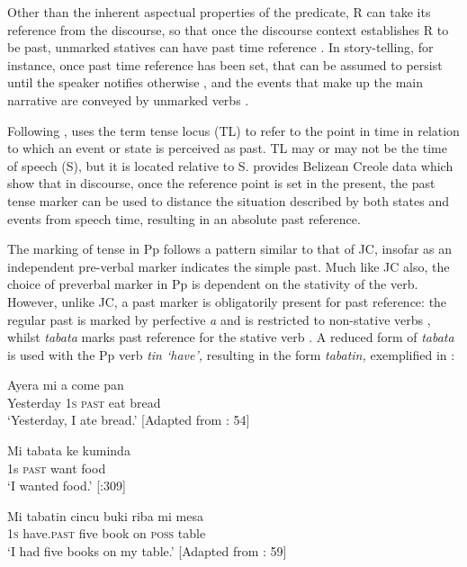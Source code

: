 \documentclass[output=paper,colorlinks,citecolor=brown]{langscibook}
\begin{document}
Other than the inherent aspectual properties of the predicate, R can take its reference from the discourse, so that once the discourse context establishes R to be past, unmarked statives can have past time reference \citep[396]{Winford2000tenseaspect}. In story-telling, for instance, once past time reference has been set, that can be assumed to persist until the speaker notifies otherwise \citep[159]{Winford2001comparison}, and the events that make up the main narrative are conveyed by unmarked verbs \citep[404]{Winford2000tenseaspect}.

Following \citet{ChungTimberlake1985}, \citet{Gooden2008} uses the term tense locus (TL) to refer to the point in time in relation to which an event or state is perceived as past. TL may or may not be the time of speech (S), but it is located relative to S. \citet[322ff.]{Gooden2008} provides Belizean Creole data which show that in discourse, once the reference point is set in the present, the past tense marker can be used to distance the situation described by both states and events from speech time, resulting in an absolute past reference.

The marking of tense in Pp follows a pattern similar to that of JC, insofar as an independent pre-verbal marker indicates the simple past. Much like JC also, the choice of preverbal marker in Pp is dependent on the stativity of the verb{. However, unlike JC,} a past marker is obligatorily present for past reference: the regular past is marked by perfective \textit{a} and is restricted to non-stative verbs , whilst \textit{tabata} marks past reference for the stative verb . A reduced form of \textit{tabata} is used with the Pp verb \textit{tin ‘have’,} resulting in the form \textit{tabatin,} exemplified in :

\ea \label{bkm:messamK:6}
\gll   Ayera      mi  a      come pan\\
 Yesterday \textsc{1s}  \textsc{past} eat    bread\\
\glt  `Yesterday, I ate bread.’
                [Adapted from \citealt{Goilo2000}: 54]
\z



\ea \label{bkm:messamK:7}
\gll      Mi tabata ke kuminda\\
1s \textsc{past} want food\\
\glt `I wanted food.’
            [\citealt{KouwenbergRamos2007}:309]
\z



\ea \label{bkm:messamK:8}
\gll   Mi  tabatin      cincu buki riba mi     mesa\\
 1\textsc{s} have.\textsc{past} five   book on   \textsc{poss} table\\
\glt  `I had five books on my table.’
                [Adapted from \citealt{Goilo2000}: 59]
\z
\end{document}

